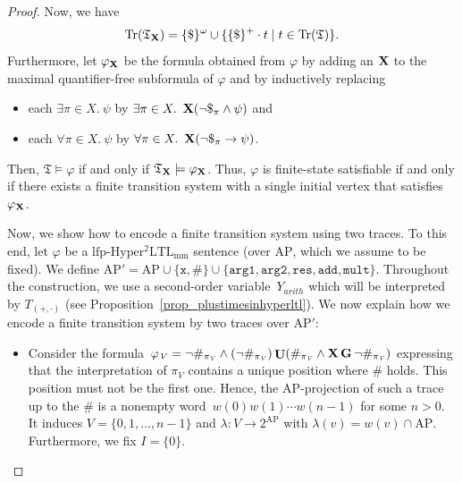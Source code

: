 \documentclass[dvipsnames,10pt,a4paper]{amsart}
\theoremstyle{definition}
\theoremstyle{remark}
\renewcommand{\phi}{\varphi}
\newcommand{\pow}[1]{2^{#1}}
\newcommand{\set}[1]{\{#1\}}
\newcommand{\G}{\mathop{\mathbf{G}\vphantom{a}}\nolimits}
\DeclareMathOperator{\U}{\mathbf{U}}
\newcommand{\X}{\mathop{\mathbf{X}\vphantom{a}}\nolimits}
\newcommand{\lfpsohyltlfp}{\mathrm{lfp\text{-}{Hyper^2LTL_{\mathrm{mm}}}}\xspace}
\newcommand{\ap}[0]{\mathrm{AP}}
\newcommand{\tsys}{\mathfrak{T}}
\newcommand{\traces}{\mathrm{Tr}}
\newcommand{\inprop}{\mathtt{x}}
\newcommand{\argone}{\texttt{arg1}}
\newcommand{\argtwo}{\texttt{arg2}}
\newcommand{\res}{\texttt{res}}
\newcommand{\add}{\texttt{add}}
\newcommand{\mult}{\texttt{mult}}
\newcommand{\plustimes}{{(+,\cdot)}}
\newcommand{\arith}{\mathit{arith}}
\newcommand{\vertices}{\mathit{V}}
\begin{document}
\begin{proof}
Now, we have
\[
\traces(\tsys_{\X}) = \set{\$}^\omega \cup \set{\set{\$}^+\cdot t \mid t \in \traces(\tsys) }.
\]
Furthermore, let $\phi_{\X}$ be the formula obtained from $\phi$ by adding an $\X$ to the maximal quantifier-free subformula of $\phi$ and by inductively replacing 
\begin{itemize}
\item each $\exists \pi \in X.\ \psi$ by $\exists \pi \in X.\ \X(\neg\$_\pi \wedge \psi)$ and
\item each $\forall \pi \in X.\ \psi$ by $\forall \pi \in X.\ \X(\neg\$_\pi \rightarrow \psi)$.
\end{itemize}
Then, $\tsys \models \phi$ if and only if $\tsys_{\X} \models \phi_{\X}$.
Thus, $\phi$ is finite-state satisfiable if and only if there exists a finite transition system with a single initial vertex that satisfies $\phi_{\X}$.

Now, we show how to encode a finite transition system using two traces. 
To this end, let $\phi$ be a $\lfpsohyltlfp$ sentence (over $\ap$, which we assume to be fixed).
We define $\ap' =  \ap \cup \set{\inprop,\#} \cup \set{\argone, \argtwo, \res, \add, \mult}$. 
Throughout the construction, we use a second-order variable~$Y_\arith$ which will be interpreted by $T_\plustimes$ (see Proposition~\ref{prop_plustimesinhyperltl}).
We now explain how we encode a finite transition system by two traces over $\ap'$:
\begin{itemize}
	\item Consider the formula~$\phi_\vertices = \neg \#_{\pi_\vertices} \wedge (\neg \#_{\pi_\vertices}) \U (\#_{\pi_\vertices} \wedge \X\G \neg \#_{\pi_\vertices})$ expressing that the interpretation of ${\pi_\vertices}$ contains a unique position where $\#$ holds. This position must not be the first one. Hence, the $\ap$-projection of such a trace up to the $\#$ is a nonempty word~$w(0)w(1)\cdots w(n-1)$ for some $n > 0$. 
	It induces $V = \set{0,1,\ldots, n-1}$ and $\lambda \colon V \rightarrow \pow{\ap}$ with $\lambda(v) = w(v) \cap \ap$. Furthermore, we fix $I = \set{0}$.
	

\end{itemize}
\end{proof}
\end{document}
